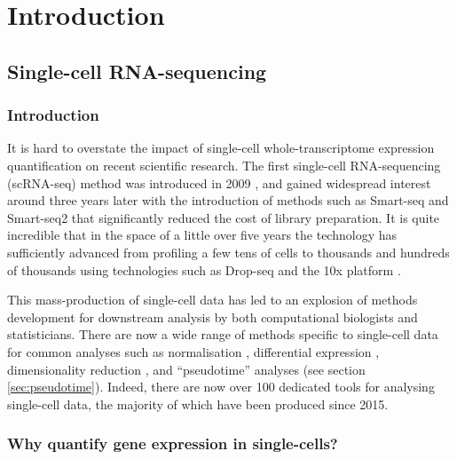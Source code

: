 \chapter{Introduction}\label{ch:introduction}

\section{Single-cell RNA-sequencing}

\subsection{Introduction}

It is hard to overstate the impact of single-cell whole-transcriptome expression quantification on recent scientific research. The first single-cell RNA-sequencing (scRNA-seq) method was introduced in 2009 \cite{Tang2009-th}, and gained widespread interest around three years later with the introduction of methods such as Smart-seq \cite{Ramskold2012-wt} and Smart-seq2 \cite{Picelli2013-tm} that significantly reduced the cost of library preparation. It is quite incredible that in the space of a little over five years the technology has sufficiently advanced from profiling a few tens of cells to thousands and hundreds of thousands using technologies such as Drop-seq \cite{Macosko2015-ek} and the 10x platform \cite{Zheng2017-vj}.

This mass-production of single-cell data has led to an explosion of methods development for downstream analysis by both computational biologists and statisticians. There are now a wide range of methods specific to single-cell data for common analyses such as normalisation \cite{Lun2016-oj,Bacher2017-ga}, differential expression \cite{Kharchenko2014,Delmans2016-po,Korthauer2016-iz}, dimensionality reduction \cite{pierson2015zifa,Wang2017-dl}, and ``pseudotime'' analyses (see section \ref{sec:pseudotime}). Indeed, there are now over 100 dedicated tools for analysing single-cell data, 
the majority of which have been produced since 2015.

\subsection{Why quantify gene expression in single-cells?}

